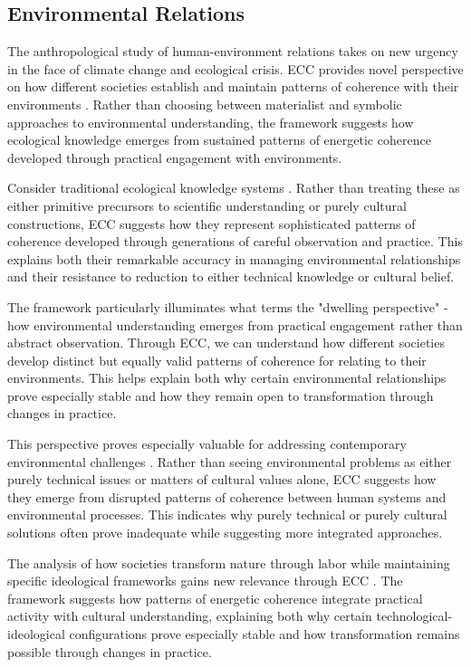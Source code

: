 \begin{refsection}
\subsection{Environmental Relations}

The anthropological study of human-environment relations takes on new urgency in the face of climate change and ecological crisis. ECC provides novel perspective on how different societies establish and maintain patterns of coherence with their environments \cite{ingold2000perception}. Rather than choosing between materialist and symbolic approaches to environmental understanding, the framework suggests how ecological knowledge emerges from sustained patterns of energetic coherence developed through practical engagement with environments.

Consider traditional ecological knowledge systems \cite{berkes2012sacred}. Rather than treating these as either primitive precursors to scientific understanding or purely cultural constructions, ECC suggests how they represent sophisticated patterns of coherence developed through generations of careful observation and practice. This explains both their remarkable accuracy in managing environmental relationships and their resistance to reduction to either technical knowledge or cultural belief.

The framework particularly illuminates what \cite{ingold2000perception} terms the "dwelling perspective" - how environmental understanding emerges from practical engagement rather than abstract observation. Through ECC, we can understand how different societies develop distinct but equally valid patterns of coherence for relating to their environments. This helps explain both why certain environmental relationships prove especially stable and how they remain open to transformation through changes in practice.

This perspective proves especially valuable for addressing contemporary environmental challenges \cite{tsing2015mushroom}. Rather than seeing environmental problems as either purely technical issues or matters of cultural values alone, ECC suggests how they emerge from disrupted patterns of coherence between human systems and environmental processes. This indicates why purely technical or purely cultural solutions often prove inadequate while suggesting more integrated approaches.

The analysis of how societies transform nature through labor while maintaining specific ideological frameworks gains new relevance through ECC \cite{bateson1972steps}. The framework suggests how patterns of energetic coherence integrate practical activity with cultural understanding, explaining both why certain technological-ideological configurations prove especially stable and how transformation remains possible through changes in practice.


\end{refsection}
